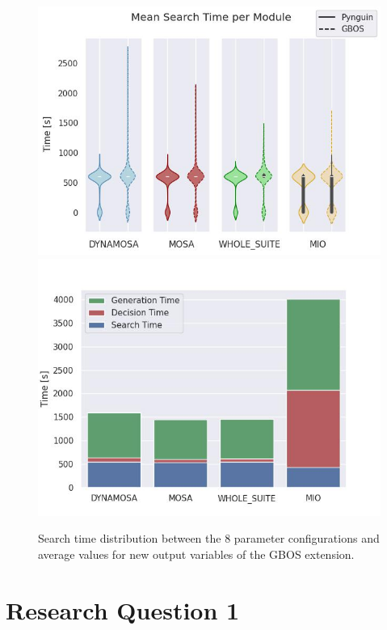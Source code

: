 \documentclass[%
  chapterprefix=false,%
  open=right,%
  twoside=true,%
  paper=a4,%
  logofile={Figures/logo.png},%
  thesistype=master,%
  UKenglish,%
]{se2thesis}
\begin{document}
\begin{figure}[th]\label{fig:times}
  \includegraphics[width=\linewidth]{Figures/Results/SearchTime.jpg}
\endminipage\hfill
{}
  \includegraphics[width=\linewidth]{Figures/Results/timeDist.jpg}
\endminipage\@
\caption{Search time distribution between the 8 parameter configurations and average values for new output variables of the GBOS extension.}
\end{figure}

\newpage

\section{Research Question 1}
\end{document}
